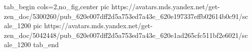  
 
 
 
 


\ifcmt
  tab_begin cols=2,no_fig,center
     pic https://avatars.mds.yandex.net/get-zen_doc/5300260/pub_620e007dff2d5a753ed7a43e_620e197337effb02614b0c91/scale_1200
		 pic https://avatars.mds.yandex.net/get-zen_doc/5042448/pub_620e007dff2d5a753ed7a43e_620e1ad265cfc511bf2e6021/scale_1200
  tab_end
\fi
